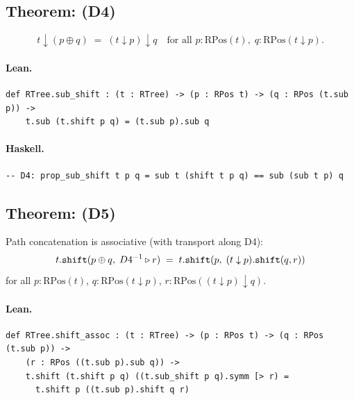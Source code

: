 \documentclass[11pt,a4paper]{article}
\begin{document}
\subsection{Theorem:  (D4)}

\begin{thm}
\[
  t \downarrow (p \oplus q) \;=\; (t \downarrow p) \downarrow q
  \quad\text{for all } p : \mathrm{RPos}(t),\; q : \mathrm{RPos}(t \downarrow p).
\]
\end{thm}

\paragraph{Lean.}
\begin{lstlisting}[style=lean]
def RTree.sub_shift : (t : RTree) -> (p : RPos t) -> (q : RPos (t.sub p)) ->
    t.sub (t.shift p q) = (t.sub p).sub q
\end{lstlisting}

\paragraph{Haskell.}
\begin{lstlisting}[style=haskell]
-- D4: prop_sub_shift t p q = sub t (shift t p q) == sub (sub t p) q
\end{lstlisting}


\subsection{Theorem:  (D5)}

\begin{thm}
Path concatenation is associative (with transport along D4):
\[
  t.\texttt{shift}(p \oplus q,\; D4^{-1} \triangleright r)
  \;=\;
  t.\texttt{shift}(p,\; (t \downarrow p).\texttt{shift}(q, r))
\]
for all $p : \mathrm{RPos}(t)$, $q : \mathrm{RPos}(t \downarrow p)$,
$r : \mathrm{RPos}((t \downarrow p) \downarrow q)$.
\end{thm}

\paragraph{Lean.}
\begin{lstlisting}[style=lean]
def RTree.shift_assoc : (t : RTree) -> (p : RPos t) -> (q : RPos (t.sub p)) ->
    (r : RPos ((t.sub p).sub q)) ->
    t.shift (t.shift p q) ((t.sub_shift p q).symm [> r) =
      t.shift p ((t.sub p).shift q r)
\end{lstlisting}
\end{document}
